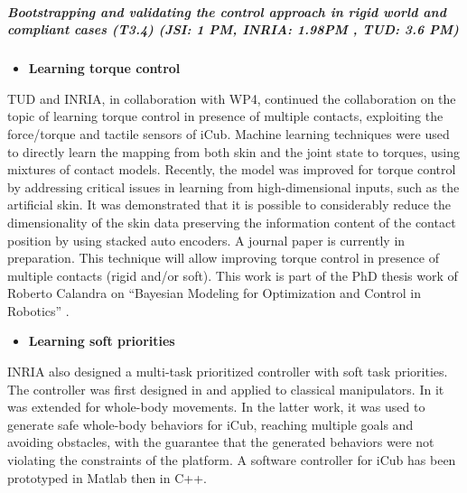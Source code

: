 \subparagraph{Bootstrapping and validating the control approach in rigid world and compliant cases (T3.4) (JSI: 1 PM, INRIA: 1.98PM , TUD: 3.6 PM)}

\begin{itemize}
\item \textbf{Learning torque control}
\end{itemize}
TUD and INRIA, in collaboration with WP4, continued the collaboration on the topic of learning torque control in presence of multiple contacts, exploiting the force/torque and tactile sensors of iCub. Machine learning techniques were used to directly learn the mapping from both skin and the joint state to torques, using mixtures of contact models. Recently, the model was improved for torque control by addressing critical issues in learning from high-dimensional inputs, such as the artificial skin. It was demonstrated that it is possible to considerably reduce the dimensionality of the skin data preserving the information content of the contact position by using stacked auto encoders. A journal paper is currently in preparation. This technique will allow improving torque control in presence of multiple contacts (rigid and/or soft). This work is part of the PhD thesis work of Roberto Calandra on ``Bayesian Modeling for Optimization and Control in Robotics'' \cite{calandra2016PhD}.\\

\begin{itemize}
\item \textbf{Learning soft priorities}
\end{itemize}
INRIA also designed a multi-task prioritized controller with soft task priorities. The controller was first designed in \cite{Modugno2016} and applied to classical manipulators. In \cite{modugno2016learning} it was extended for whole-body movements. In the latter work, it was used to generate safe whole-body behaviors for iCub, reaching multiple goals and avoiding obstacles, with the guarantee that the generated behaviors were not violating the constraints of the platform. A software controller for iCub has been prototyped in Matlab then in C++.

